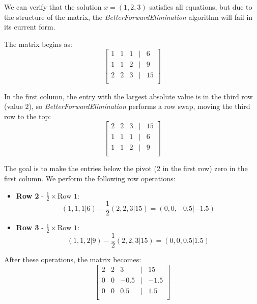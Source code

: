 \documentclass[12pt]{amsart}
\begin{document}
\begin{enumerate}[1.]
We can verify that the solution \( x = (1, 2, 3) \) satisfies all equations, but due to the structure of the matrix, the \textit{BetterForwardElimination} algorithm will fail in its current form.

The matrix begins as:
\begin{equation*}
\begin{bmatrix}
1 & 1 & 1 & | & 6 \\
1 & 1 & 2 & | & 9 \\
2 & 2 & 3 & | & 15 \\
\end{bmatrix}
\end{equation*}

In the first column, the entry with the largest absolute value is in the third row (value 2), so \textit{BetterForwardElimination} performs a row swap, moving the third row to the top:
\begin{equation*}
\begin{bmatrix}
2 & 2 & 3 & | & 15 \\
1 & 1 & 1 & | & 6 \\
1 & 1 & 2 & | & 9 \\
\end{bmatrix}
\end{equation*}

The goal is to make the entries below the pivot (2 in the first row) zero in the first column. We perform the following row operations:

\begin{itemize}
    \item \textbf{Row 2} - \( \frac{1}{2} \times \text{Row 1} \):
    \begin{equation*}
    (1, 1, 1 | 6) - \frac{1}{2} (2, 2, 3 | 15) = (0, 0, -0.5 | -1.5)
    \end{equation*}
    \item \textbf{Row 3} - \( \frac{1}{2} \times \text{Row 1} \):
    \begin{equation*}
    (1, 1, 2 | 9) - \frac{1}{2} (2, 2, 3 | 15) = (0, 0, 0.5 | 1.5)
    \end{equation*}
\end{itemize}

After these operations, the matrix becomes:
\begin{equation*}
\begin{bmatrix}
2 & 2 & 3 & | & 15 \\
0 & 0 & -0.5 & | & -1.5 \\
0 & 0 & 0.5 & | & 1.5 \\
\end{bmatrix}
\end{equation*}


\end{enumerate}
\end{document}
